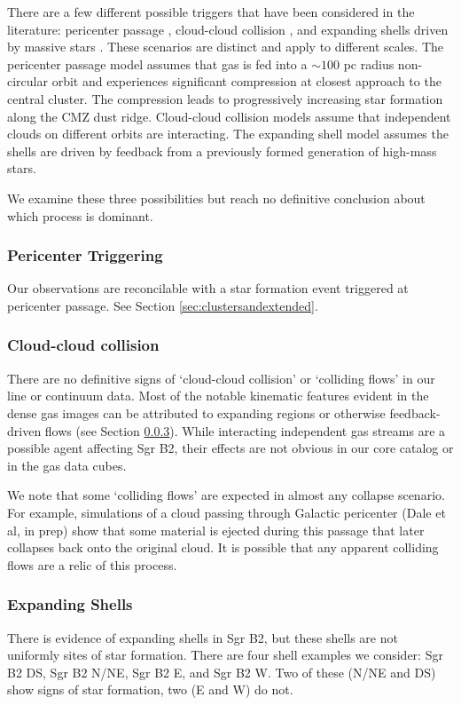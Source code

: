 \documentclass[twocolumn]{aastex61}
\begin{document}
There are a few different possible triggers that have been considered in the
literature: pericenter passage \citep{Kruijssen2015a}, cloud-cloud collision
\citep{Hasegawa1994a,Mehringer1997a,Sato2000a}, and expanding shells driven by
massive stars \citep{Martin-Pintado1999a}.  These scenarios are distinct and
apply to different scales.  The pericenter passage model assumes that gas is
fed into a $\sim100$ pc radius non-circular orbit and experiences significant
compression at closest approach to the central cluster.  The compression leads
to progressively increasing star formation along the CMZ dust ridge.
Cloud-cloud collision models assume that independent clouds on different orbits
are interacting.  The expanding shell model assumes the shells are driven by
feedback from a previously formed generation of high-mass stars.

We examine these three possibilities but reach no definitive conclusion about
which process is dominant.

\subsubsection{Pericenter Triggering}
Our observations are reconcilable with a star formation event triggered
at pericenter passage.  See Section \ref{sec:clustersandextended}.

\subsubsection{Cloud-cloud collision}
There are no definitive signs of `cloud-cloud collision' or `colliding flows'
in our line or continuum data.  Most of the notable kinematic features evident
in the dense gas images can be attributed to expanding \hii regions or
otherwise feedback-driven flows (see Section \ref{sec:expandingshells}).  While
interacting independent gas streams are a possible agent affecting Sgr B2,
their effects are not obvious in our core catalog or in the gas data cubes.

We note that some `colliding flows' are expected in almost any collapse
scenario.  For example, simulations of a cloud passing through Galactic
pericenter (Dale et al, in prep) show that some material is ejected during this
passage that later collapses back onto the original cloud.  It is possible that
any apparent colliding flows are a relic of this process.

\subsubsection{Expanding Shells}
\label{sec:expandingshells}
There is evidence of expanding shells in Sgr B2, but 
these shells are not uniformly sites of star formation.
There are four shell examples we consider: Sgr B2 DS, Sgr B2 N/NE,
Sgr B2 E, and Sgr B2 W.  Two of these (N/NE and DS) show signs
of star formation, two (E and W) do not.
\end{document}
